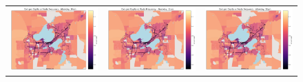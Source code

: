 \documentclass[letter]{article}
\begin{document}
\begin{figure}
\begin{center}
\begin{tabular}{ c c c }
        \includegraphics[width=60mm]{CarOwnershipVSfrequency10am.png}   & \includegraphics[width=60mm]{CarOwnershipVSfrequency11am.png}  & \includegraphics[width=60mm]{CarOwnershipVSfrequency12pm.png}  \\
        
          \end{tabular}
\end{center}
\end{figure}
\end{document}
